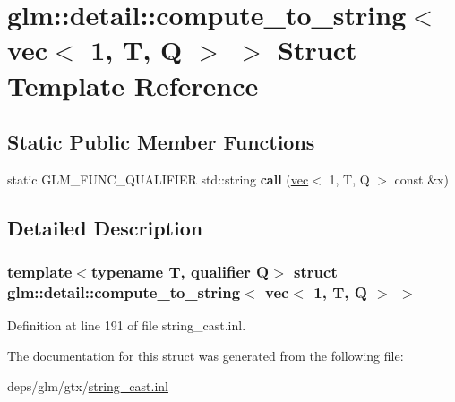 \hypertarget{structglm_1_1detail_1_1compute__to__string_3_01vec_3_011_00_01T_00_01Q_01_4_01_4}{}\section{glm\+:\+:detail\+:\+:compute\+\_\+to\+\_\+string$<$ vec$<$ 1, T, Q $>$ $>$ Struct Template Reference}
\label{structglm_1_1detail_1_1compute__to__string_3_01vec_3_011_00_01T_00_01Q_01_4_01_4}
\subsection*{Static Public Member Functions}
\begin{DoxyCompactItemize}
\item 
\mbox{\label{structglm_1_1detail_1_1compute__to__string_3_01vec_3_011_00_01T_00_01Q_01_4_01_4_ad8aa70be55855aba1c6c6796caf5b0cf}} 
static G\+L\+M\+\_\+\+F\+U\+N\+C\+\_\+\+Q\+U\+A\+L\+I\+F\+I\+ER std\+::string {\bfseries call} (\hyperlink{structglm_1_1vec}{vec}$<$ 1, T, Q $>$ const \&x)
\end{DoxyCompactItemize}


\subsection{Detailed Description}
\subsubsection*{template$<$typename T, qualifier Q$>$\newline
struct glm\+::detail\+::compute\+\_\+to\+\_\+string$<$ vec$<$ 1, T, Q $>$ $>$}



Definition at line 191 of file string\+\_\+cast.\+inl.



The documentation for this struct was generated from the following file\+:\begin{DoxyCompactItemize}
\item 
deps/glm/gtx/\hyperlink{string__cast_8inl}{string\+\_\+cast.\+inl}\end{DoxyCompactItemize}
